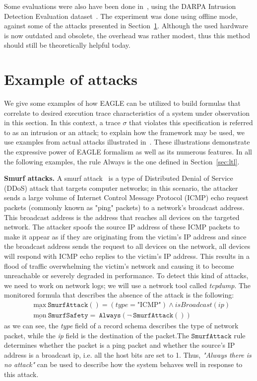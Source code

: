 \documentclass[english]{article}
\begin{document}
Some evaluations were also have been done in~\cite{naldurg2004temporal}, using the DARPA Intrusion Detection Evaluation dataset~\cite{mchugh2000testing}. The experiment was done using offline mode, against some of the attacks presented in Section~\ref{attacks}. Although the used hardware is now outdated and obsolete, the overhead was rather modest, thus this method should still be theoretically helpful today.

\section{Example of attacks}\label{attacks}
We give some examples of how EAGLE can be utilized to build formulas that correlate to desired execution trace characteristics of a system under observation in this section. In this context, a trace $\sigma$ that violates this specification is referred to as an intrusion or an attack; to explain how the framework may be used, we use examples from actual attacks illustrated in~\cite{naldurg2004temporal}. These illustrations demonstrate the expressive power of EAGLE formalism as well as its numerous features. In all the following examples, the rule Always is the one defined in Section~\ref{sec:ltl}.

\textbf{Smurf attacks.}
A smurf attack~\cite{zargar2009identification} is a type of Distributed Denial of Service (DDoS) attack that targets computer networks; in this scenario, the attacker sends a large volume of Internet Control Message Protocol (ICMP) echo request packets (commonly known as "ping" packets) to a network's broadcast address. This broadcast address is the address that reaches all devices on the targeted network. The attacker spoofs the source IP address of these ICMP packets to make it appear as if they are originating from the victim's IP address and since the broadcast address sends the request to all devices on the network, all devices will respond with ICMP echo replies to the victim's IP address. This results in a flood of traffic overwhelming the victim's network and causing it to become unreachable or severely degraded in performance. To detect this kind of attacks, we need to work on network logs; we will use a network tool called \textit{tcpdump}. The monitored formula that describes the absence of the attack is the following:
\begin{align*}
    & \underline{\text{max}}\ \mathtt{SmurfAttack()} = (type = \text{"ICMP"})\land isBroadcast(ip) \\
    & \underline{\text{mon}}\ \mathtt{SmurfSafety} =\ \mathtt{Always}(\neg\ \mathtt{SmurfAttack()}) 
\end{align*}
as we can see, the \textit{type} field of a record schema describes the type of network packet, while the \textit{ip} field is the destination of the packet.The $\mathtt{SmurfAttack}$ rule determines whether the packet is a ping packet and whether the source's IP address is a broadcast ip, i.e. all the host bits are set to 1. Thus, \textit{"Always there is no attack"} can be used to describe how the system behaves well in response to this attack.
\end{document}
